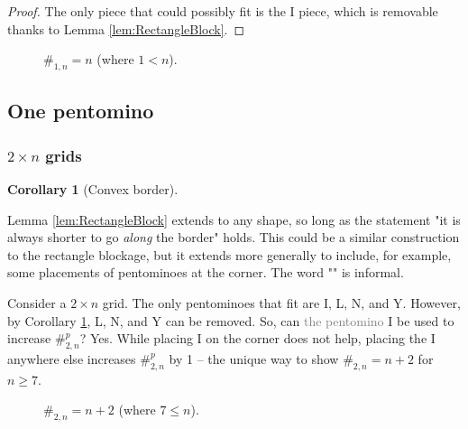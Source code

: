 \documentclass{article}
\theoremstyle{definition} %
\newtheorem{corollary}{Corollary}[theorem]
\newcommand{\minordetail}[1]{\textcolor{gray}{#1}}
\newcommand{\badterm}[1]{\textcolor{red}{\uwave{\textcolor{black}{#1}}}}
\begin{document}
\begin{proof}
The only piece that could possibly fit is the I piece, which is removable thanks to Lemma \ref{lem:RectangleBlock}.
\end{proof}

\begin{figure}[!h]
    \centering
    \caption{$\#_{1, n} = n$ (where $1 < n$).}
\end{figure}




\subsection{One pentomino}

\subsubsection{\texorpdfstring{$2 \times n$}{2 \texttimes n} grids}

\begin{corollary}[Convex border]
\label{cor:Convexborder}

Lemma \ref{lem:RectangleBlock} extends to any shape, so long as the statement "it is always shorter to go \emph{along} the border" holds. This could be a similar construction to the rectangle blockage, but it extends more generally to include, for example, some placements of pentominoes at the corner. The word "\badterm{convex}" is informal.
\end{corollary}

Consider a $2 \times n$ grid. The only pentominoes that fit are I, L, N, and Y. However, by Corollary \ref{cor:Convexborder}, L, N, and Y can be removed. So, can \minordetail{the pentomino} I be used to increase $\#^p_{2, n}$? Yes. While placing I on the corner does not help, placing the I anywhere else increases $\#^p_{2, n}$ by 1 -- the unique way to show $\#_{2, n} = n + 2$ for $n \ge 7$.

\begin{figure}[!h]
    \centering
    \caption{$\#_{2, n} = n + 2$ (where $7 \le n$). \cite{sheet}}
\end{figure}
\end{document}
